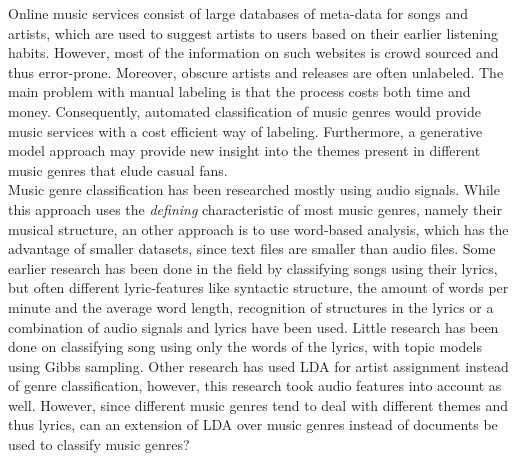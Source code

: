 
Online music services consist of large databases of meta-data for songs and artists, which are used to suggest artists to users based on their earlier listening habits. However, most of the information on such websites is crowd sourced and thus error-prone. Moreover, obscure artists and releases are often unlabeled. The main problem with manual labeling is that the process costs both time and money.  Consequently, automated classification of music genres would provide music services with a cost efficient way of labeling. Furthermore, a generative model approach may provide new insight into the themes present in different music genres that elude casual fans.\\
Music genre classification has been researched mostly using audio signals\cite{audio_classification}. While this approach uses the \textit{defining} characteristic of most music genres, namely their musical structure, an other approach is to use word-based analysis, which has the advantage of smaller datasets, since text files are smaller than audio files. Some earlier research has been done in the field by classifying songs using their lyrics, but often different lyric-features like syntactic structure\cite{felllyrics}, the amount of words per minute and the average word length\cite{mayeraudiolyrics}, recognition of structures in the lyrics\cite{maxwellgenome} or a combination of audio signals and lyrics\cite{mayeraudiolyrics} have been used. Little research has been done on classifying song using only the words of the lyrics\cite{stateoftheart}, with topic models using Gibbs sampling. Other research has used LDA for artist assignment instead of genre classification\cite{liartists}, however, this research took audio features into account as well. However, since different music genres tend to deal with different themes and thus lyrics, can an extension of LDA over music genres instead of documents be used to classify music genres?\\
